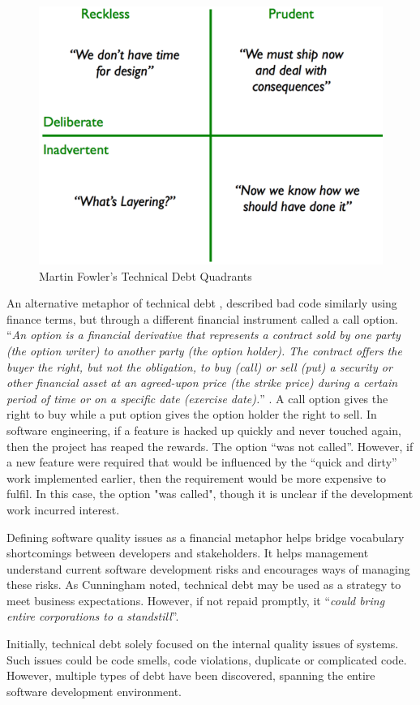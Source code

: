 \documentclass{mprop}
\begin{document}
\begin{figure}
	\centering
	\includegraphics[width=0.5\linewidth]{visualisations/TD_quadrants.png}
	\caption{Martin Fowler's Technical Debt Quadrants}
	\label{fig:td-quandrants}
\end{figure}


An alternative metaphor of technical debt \cite{UnhedgedCallOption}, described
bad code similarly using finance terms, but through a different financial
instrument called a call option. ``\textit{An option is a financial derivative
that represents a contract sold by one party (the option writer) to another
party (the option holder). The contract offers the buyer the right, but not the
obligation, to buy (call) or sell (put) a security or other financial asset at
an agreed-upon price (the strike price) during a certain period of time or on a
specific date (exercise date).}'' \cite{option-investopedia}. A call option
gives the right to buy while a put option gives the option holder the right to
sell. In software engineering, if a feature is hacked up quickly and never
touched again, then the project has reaped the rewards. The option ``was not
called''. However, if a new feature were required that would be influenced by
the ``quick and dirty'' work implemented earlier, then the requirement would be
more expensive to fulfil. In this case, the option "was called", though it is
unclear if the development work incurred interest.


Defining software quality issues as a financial metaphor helps bridge vocabulary
shortcomings between developers and stakeholders. It helps management understand
current software development risks and encourages ways of managing these risks.
As Cunningham \cite{Cunningham1993} noted, technical debt may be used as a
strategy to meet business expectations. However, if not repaid promptly, it
``\textit{could bring entire corporations to a standstill}''.

Initially, technical debt solely focused on the internal quality issues of
systems. Such issues could be code smells, code violations, duplicate or
complicated code. However, multiple types of debt have been discovered, spanning
the entire software development environment.
\end{document}
